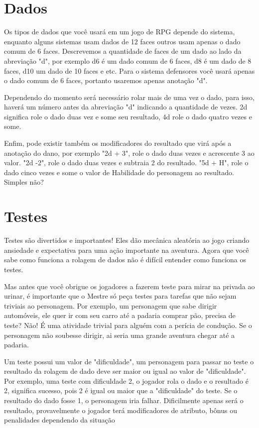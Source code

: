 \section{Dados}

Os tipos de dados que você usará em um jogo de RPG depende do sistema, enquanto alguns sistemas usam dados de 12 faces outros usam apenas o dado comum de 6 faces. Descrevemos a quantidade de faces de um dado ao lado da abreviação "d", por exemplo d6 é um dado comum de 6 faces, d8 é um dado de 8 faces, d10 um dado de 10 faces e etc. Para o sistema defensores você usará apenas o dado comum de 6 faces, portanto usaremos apenas anotação "d".

Dependendo do momento será necessário rolar mais de uma vez o dado, para isso, haverá um número antes da abreviação "d" indicando a quantidade de vezes. 2d significa role o dado duas vez e some seu resultado, 4d role o dado quatro vezes e some.

Enfim, pode existir também os modificadores do resultado que virá após a anotação do dano, por exemplo "2d + 3", role o dado duas vezes e acrescente 3 ao valor. "2d -2", role o dado duas vezes e subtraia 2 do resultado. "5d + H", role o dado cinco vezes e some o valor de Habilidade do personagem ao resultado. Simples não?

\section{Testes}
Testes são divertidos e importantes! Eles dão mecânica aleatória ao jogo criando ansiedade e expectativa para uma ação importante na aventura. Agora que você sabe como funciona a rolagem de dados não é difícil entender como funciona os testes.

Mas antes que você obrigue os jogadores a fazerem teste para mirar na privada ao urinar, é importante que o Mestre só peça testes para tarefas que não sejam triviais ao personagem. Por exemplo, um personagem que sabe dirigir automóveis, ele quer ir com seu carro até a padaria comprar pão, precisa de teste? Não! É uma atividade trivial para alguém com a perícia de condução. Se o personagem não soubesse dirigir, ai seria uma grande aventura chegar até a padaria.

Um teste possui um valor de "dificuldade", um personagem para passar no teste o resultado da rolagem de dado deve ser maior ou igual ao valor de "dificuldade". Por exemplo, uma teste com dificuldade 2, o jogador rola o dado e o resultado é 2, significa sucesso, pois 2 é igual ou maior que a "dificuldade" do teste. Se o resultado do dado fosse 1, o personagem iria falhar. Dificilmente apenas será o resultado, provavelmente o jogador terá modificadores de atributo, bônus ou penalidades dependendo da situação


